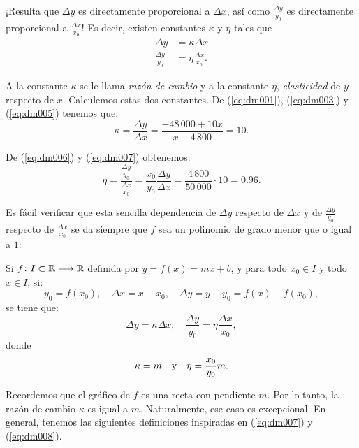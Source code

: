 ¡Resulta que $\Delta y$ es directamente proporcional a $\Delta x$, así como $\frac{\Delta y}{y_0}$
es directamente proporcional a $\frac{\Delta x}{x_0}$! Es decir, existen constantes $\kappa$ y
$\eta$ tales que
\begin{align}
\Delta y &= \kappa\Delta x \label{eq:dm005}\\
\frac{\Delta y}{y_0} &= \eta\frac{\Delta x}{x_0}. \label{eq:dm006}
\end{align}

A la constante $\kappa$ se le llama \emph{razón de cambio} y a la constante $\eta$,
\emph{elasticidad} de $y$ respecto de $x$. Calculemos estas dos constantes. De (\ref{eq:dm001}),
(\ref{eq:dm003}) y (\ref{eq:dm005}) tenemos que:
\begin{equation}
\label{eq:dm007}
\kappa = \frac{\Delta y}{\Delta x} = \frac{-48\,000 + 10x}{x - 4\,800} = 10.
\end{equation}

De (\ref{eq:dm006}) y (\ref{eq:dm007}) obtenemos:
\begin{equation}
\label{eq:dm008}
\eta = \frac{\displaystyle\frac{\Delta y}{y_0}}{\displaystyle\frac{\Delta x}{x_0}}
    = \frac{x_0}{y_0}\frac{\Delta y}{\Delta x} = \frac{4\,800}{50\,000}\cdot 10 = 0.96.
\end{equation}

Es fácil verificar que esta sencilla dependencia de $\Delta y$ respecto de $\Delta x$ y de
$\frac{\Delta y}{y_0}$ respecto de $\frac{\Delta x}{x_0}$ se da siempre que $f$ sea un polinomio de
grado menor que o igual a $1$:

\begin{teocal}
Si $f\colon I\subset\mathbb{R}\longrightarrow \mathbb{R}$ definida por $y = f(x) = mx + b$, y para todo
$x_0\in I$ y todo $x\in I$, si:
\[
y_0 = f(x_0), \quad \Delta x = x - x_0, \quad \Delta y = y - y_0 = f(x) - f(x_0),
\]
se tiene que:
\begin{equation}
\label{eq:dm009}
\Delta y = \kappa\Delta x, \quad \frac{\Delta y}{y_0} = \eta\frac{\Delta x}{x_0},
\end{equation}
donde
\begin{equation}
\label{eq:dm010}
\kappa = m \quad\text{y}\quad \eta = \frac{x_0}{y_0}m.
\end{equation}
\end{teocal}

Recordemos que el gráfico de $f$ es una recta con pendiente $m$. Por lo tanto, la razón de cambio
$\kappa$ es igual a $m$. Naturalmente, ese caso es excepcional. En general, tenemos las siguientes
definiciones inspiradas en (\ref{eq:dm007}) y (\ref{eq:dm008}).

